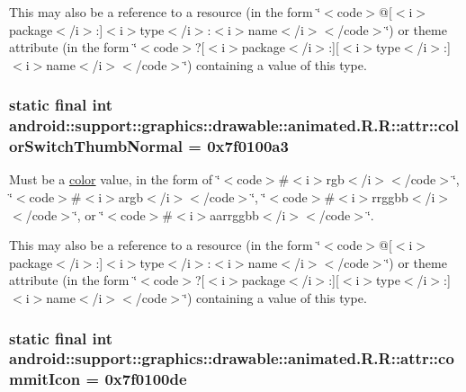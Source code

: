 This may also be a reference to a resource (in the form \char`\"{}$<$code$>$@\mbox{[}$<$i$>$package$<$/i$>$:\mbox{]}$<$i$>$type$<$/i$>$:$<$i$>$name$<$/i$>$$<$/code$>$\char`\"{}) or theme attribute (in the form \char`\"{}$<$code$>$?\mbox{[}$<$i$>$package$<$/i$>$:\mbox{]}\mbox{[}$<$i$>$type$<$/i$>$:\mbox{]}$<$i$>$name$<$/i$>$$<$/code$>$\char`\"{}) containing a value of this type. \hypertarget{classandroid_1_1support_1_1graphics_1_1drawable_1_1animated_1_1_r_1_1attr_aa3c70b2ea37c0ce9be27034ae3f3112}{
\subsubsection[{colorSwitchThumbNormal}]{\setlength{\rightskip}{0pt plus 5cm}static final int android::support::graphics::drawable::animated.R.R::attr::colorSwitchThumbNormal = 0x7f0100a3}}
\label{classandroid_1_1support_1_1graphics_1_1drawable_1_1animated_1_1_r_1_1attr_aa3c70b2ea37c0ce9be27034ae3f3112}


Must be a \hyperlink{classandroid_1_1support_1_1graphics_1_1drawable_1_1animated_1_1_r_1_1color}{color} value, in the form of \char`\"{}$<$code$>$\#$<$i$>$rgb$<$/i$>$$<$/code$>$\char`\"{}, \char`\"{}$<$code$>$\#$<$i$>$argb$<$/i$>$$<$/code$>$\char`\"{}, \char`\"{}$<$code$>$\#$<$i$>$rrggbb$<$/i$>$$<$/code$>$\char`\"{}, or \char`\"{}$<$code$>$\#$<$i$>$aarrggbb$<$/i$>$$<$/code$>$\char`\"{}. 

This may also be a reference to a resource (in the form \char`\"{}$<$code$>$@\mbox{[}$<$i$>$package$<$/i$>$:\mbox{]}$<$i$>$type$<$/i$>$:$<$i$>$name$<$/i$>$$<$/code$>$\char`\"{}) or theme attribute (in the form \char`\"{}$<$code$>$?\mbox{[}$<$i$>$package$<$/i$>$:\mbox{]}\mbox{[}$<$i$>$type$<$/i$>$:\mbox{]}$<$i$>$name$<$/i$>$$<$/code$>$\char`\"{}) containing a value of this type. \hypertarget{classandroid_1_1support_1_1graphics_1_1drawable_1_1animated_1_1_r_1_1attr_82f6482bbcd862ee920b14dd6d9f2a30}{
\subsubsection[{commitIcon}]{\setlength{\rightskip}{0pt plus 5cm}static final int android::support::graphics::drawable::animated.R.R::attr::commitIcon = 0x7f0100de}}
\label{classandroid_1_1support_1_1graphics_1_1drawable_1_1animated_1_1_r_1_1attr_82f6482bbcd862ee920b14dd6d9f2a30}


